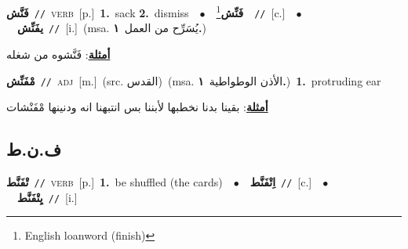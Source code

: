 \documentclass[10pt,a4paper,twoside]{article} %
\begin{document}
\begin{multicols}{2}
{\setlength\topsep{0pt}\textbf{\foreignlanguage{arabic}{فَنَّش}}\ {\color{gray}\texttt{//}\color{black}}\ \textsc{verb}\ [p.]\ \textbf{1.}~sack  \textbf{2.}~dismiss\ \ $\bullet$\ \ \setlength\topsep{0pt}\textbf{\foreignlanguage{arabic}{فَنِّش}}\footnote{English loanword (finish)}\ \ {\color{gray}\texttt{//}\color{black}}\ [c.]\ \ $\bullet$\ \ \setlength\topsep{0pt}\textbf{\foreignlanguage{arabic}{يفَنِّش}}\ {\color{gray}\texttt{//}\color{black}}\ [i.]\ \color{gray}(msa. \foreignlanguage{arabic}{يُسَرِّح من العمل}~\foreignlanguage{arabic}{\textbf{١.}})\color{black}\  \begin{flushright}\color{gray}\foreignlanguage{arabic}{\textbf{\underline{\foreignlanguage{arabic}{أمثلة}}}: فَنَّشوه من شغله}\end{flushright}\color{black}} \vspace{2mm}

{\setlength\topsep{0pt}\textbf{\foreignlanguage{arabic}{مْفَنِّش}}\ {\color{gray}\texttt{//}\color{black}}\ \textsc{adj}\ [m.]\ (src. \color{gray}\foreignlanguage{arabic}{القدس}\color{black})\ \color{gray}(msa. \foreignlanguage{arabic}{الأذن الوطواطية}~\foreignlanguage{arabic}{\textbf{١.}})\color{black}\ \textbf{1.}~protruding ear\  \begin{flushright}\color{gray}\foreignlanguage{arabic}{\textbf{\underline{\foreignlanguage{arabic}{أمثلة}}}: بقينا بدنا نخطبها لأبننا بس انتبهنا انه ودنينها مْفَنْشات}\end{flushright}\color{black}} \vspace{2mm}

\vspace{-3mm}
\subsection*{\color{blue}\foreignlanguage{arabic}{ف.ن.ط}\color{blue}{}} 

{\setlength\topsep{0pt}\textbf{\foreignlanguage{arabic}{تْفَنَّط}}\ {\color{gray}\texttt{//}\color{black}}\ \textsc{verb}\ [p.]\ \textbf{1.}~be shuffled (the cards)\ \ $\bullet$\ \ \setlength\topsep{0pt}\textbf{\foreignlanguage{arabic}{اِتْفَنَّط}}\ {\color{gray}\texttt{//}\color{black}}\ [c.]\ \ $\bullet$\ \ \setlength\topsep{0pt}\textbf{\foreignlanguage{arabic}{يِتْفَنَّط}}\ {\color{gray}\texttt{//}\color{black}}\ [i.]\ } \vspace{2mm}


\end{multicols}
\end{document}
